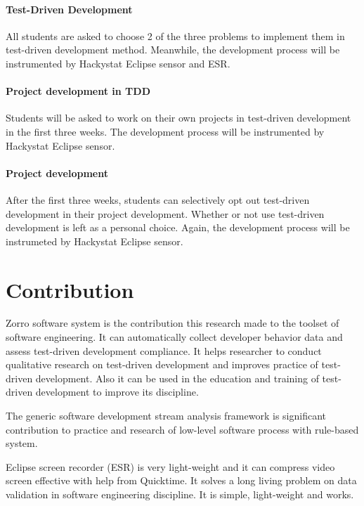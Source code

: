 \paragraph{Test-Driven Development}
All students are asked to choose 2 of the three problems to implement them
in test-driven development method. Meanwhile, the development process will
be instrumented by Hackystat Eclipse sensor and ESR.

\paragraph{Project development in TDD}
Students will be asked to work on their own projects in test-driven
development in the first three weeks. The development process will be
instrumented by Hackystat Eclipse sensor.

\paragraph{Project development}
After the first three weeks, students can selectively opt out test-driven
development in their project development. Whether or not use test-driven
development is left as a personal choice. Again, the development process
will be instrumeted by Hackystat Eclipse sensor.

\section{Contribution}
Zorro software system is the contribution this research made to the toolset
of software engineering. It can automatically collect developer behavior
data and assess test-driven development compliance. It helps researcher to
conduct qualitative research on test-driven development and improves
practice of test-driven development. Also it can be used in the education
and training of test-driven development to improve its discipline. 

The generic software development stream analysis framework is significant
contribution to practice and research of low-level software process with
rule-based system. 

Eclipse screen recorder (ESR) is very light-weight and it can compress
video screen effective with help from Quicktime. It solves a long living
problem on data validation in software engineering discipline. It is
simple, light-weight and works. 

